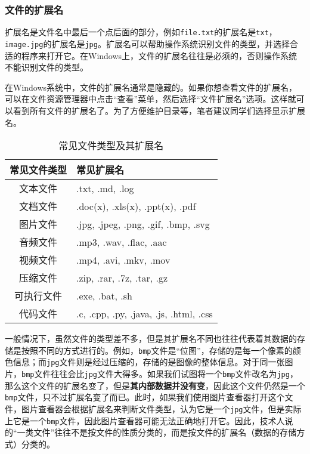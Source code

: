 \documentclass[../main.tex]{subfiles}
\begin{document}
\subsubsection{文件的扩展名}

扩展名是文件名中最后一个点后面的部分，例如\texttt{file.txt}的扩展名是\texttt{txt}，\texttt{image.jpg}的扩展名是\texttt{jpg}。扩展名可以帮助操作系统识别文件的类型，并选择合适的程序来打开它。在Windows上，文件的扩展名往往是必须的，否则操作系统不能识别文件的类型。

在Windows系统中，文件的扩展名通常是隐藏的。如果你想查看文件的扩展名，可以在文件资源管理器中点击“查看”菜单，然后选择“文件扩展名”选项。这样就可以看到所有文件的扩展名了。为了方便维护目录等，笔者建议同学们选择显示扩展名。

\begin{table}[ht]
  \centering
  \begin{tabular}{c|l}
    \toprule
    常见文件类型 & 常见扩展名 \\
    \midrule
    文本文件 & .txt, .md, .log \\
    文档文件 & .doc(x), .xls(x), .ppt(x), .pdf \\
    图片文件 & .jpg, .jpeg, .png, .gif, .bmp, .svg \\
    音频文件 & .mp3, .wav, .flac, .aac \\
    视频文件 & .mp4, .avi, .mkv, .mov \\
    压缩文件 & .zip, .rar, .7z, .tar, .gz \\
    可执行文件 & .exe, .bat, .sh \\
    代码文件 & .c, .cpp, .py, .java, .js, .html, .css \\
    \bottomrule
  \end{tabular}
  \caption{常见文件类型及其扩展名}
  \label{tab:file-extensions}
\end{table}

一般情况下，虽然文件的类型差不多，但是其扩展名不同也往往代表着其数据的存储是按照不同的方式进行的。例如，\texttt{bmp}文件是“位图”，存储的是每一个像素的颜色信息；而\texttt{jpg}文件则是经过压缩的，存储的是图像的整体信息。对于同一张图片，\texttt{bmp}文件往往会比\texttt{jpg}文件大得多。如果我们试图将一个\texttt{bmp}文件改名为\texttt{jpg}，那么这个文件的扩展名变了，但是\textbf{其内部数据并没有变}，因此这个文件仍然是一个\texttt{bmp}文件，只不过扩展名变了而已。此时，如果我们使用图片查看器打开这个文件，图片查看器会根据扩展名来判断文件类型，认为它是一个\texttt{jpg}文件，但是实际上它是一个\texttt{bmp}文件，因此图片查看器可能无法正确地打开它。因此，技术人说的“一类文件”往往不是按文件的性质分类的，而是按文件的扩展名（数据的存储方式）分类的。
\end{document}
